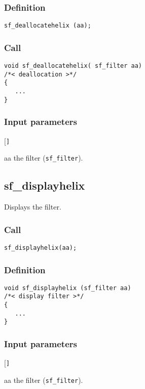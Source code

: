 \subsubsection*{Definition}
\begin{verbatim}sf_deallocatehelix (aa);\end{verbatim}

\subsubsection*{Call}
\begin{verbatim}
void sf_deallocatehelix( sf_filter aa) 
/*< deallocation >*/
{
   ...
}
\end{verbatim}

\subsubsection*{Input parameters}
\begin{desclist}{\tt }{\quad}[\tt ]
   \setlength\itemsep{0pt}
   \item[aa] the filter (\texttt{sf\_filter}).  
\end{desclist}




\subsection{{sf\_displayhelix}}
Displays the filter.

\subsubsection*{Call}
\begin{verbatim}sf_displayhelix(aa);\end{verbatim}

\subsubsection*{Definition}
\begin{verbatim}
void sf_displayhelix (sf_filter aa)
/*< display filter >*/
{
   ...
}
\end{verbatim}

\subsubsection*{Input parameters}
\begin{desclist}{\tt }{\quad}[\tt ]
   \setlength\itemsep{0pt}
   \item[aa] the filter (\texttt{sf\_filter}).  
\end{desclist}


